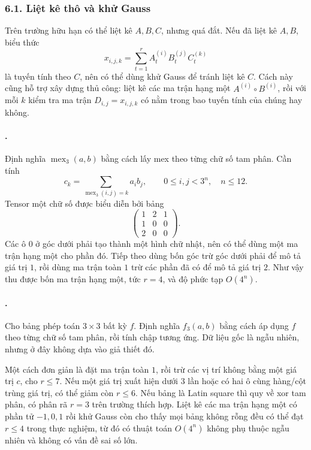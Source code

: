 \documentclass[11pt]{article}
\begin{document}
\subsubsection*{6.1. Liệt kê thô và khử Gauss}

Trên trường hữu hạn có thể liệt kê \(A,B,C\), nhưng quá đắt. Nếu đã liệt kê
\(A,B\), biểu thức
\[
  x_{i,j,k}=\sum_{t=1}^{r}A^{(i)}_tB^{(j)}_tC^{(k)}_t
\]
là tuyến tính theo \(C\), nên có thể dùng khử Gauss để tránh liệt kê \(C\).
Cách này cũng hỗ trợ xây dựng thủ công: liệt kê các ma trận hạng một
\(A^{(i)}\circ B^{(i)}\), rồi với mỗi \(k\) kiểm tra ma trận
\(D_{i,j}=x_{i,j,k}\) có nằm trong bao tuyến tính của chúng hay không.

\paragraph{.}
Định nghĩa \(\operatorname{mex}_3(a,b)\) bằng cách lấy mex theo từng chữ số
tam phân. Cần tính
\[
  c_k=\sum_{\operatorname{mex}_3(i,j)=k}a_i b_j,
  \qquad 0\le i,j<3^n,\quad n\le 12.
\]
Tensor một chữ số được biểu diễn bởi bảng
\[
  \begin{pmatrix}
    1&2&1\\
    1&0&0\\
    2&0&0
  \end{pmatrix}.
\]
Các ô \(0\) ở góc dưới phải tạo thành một hình chữ nhật, nên có thể dùng một
ma trận hạng một cho phần đó. Tiếp theo dùng bốn góc trừ góc dưới phải để mô
tả giá trị \(1\), rồi dùng ma trận toàn \(1\) trừ các phần đã có để mô tả giá
trị \(2\). Như vậy thu được bốn ma trận hạng một, tức \(r=4\), và độ phức tạp
\(O(4^n)\).

\paragraph{.}
Cho bảng phép toán \(3\times 3\) bất kỳ \(f\). Định nghĩa \(f_3(a,b)\) bằng
cách áp dụng \(f\) theo từng chữ số tam phân, rồi tính chập tương ứng. Dữ liệu
gốc là ngẫu nhiên, nhưng ở đây không dựa vào giả thiết đó.

Một cách đơn giản là đặt ma trận toàn \(1\), rồi trừ các vị trí không bằng một
giá trị \(c\), cho \(r\le 7\). Nếu một giá trị xuất hiện dưới \(3\) lần hoặc
có hai ô cùng hàng/cột trùng giá trị, có thể giảm còn \(r\le 6\). Nếu bảng là
Latin square thì quy về xor tam phân, có phân rã \(r=3\) trên trường thích
hợp. Liệt kê các ma trận hạng một có phần tử \(-1,0,1\) rồi khử Gauss còn cho
thấy mọi bảng không rỗng đều có thể đạt \(r\le 4\) trong thực nghiệm, từ đó
có thuật toán \(O(4^n)\) không phụ thuộc ngẫu nhiên và không có vấn đề sai số
lớn.
\end{document}
